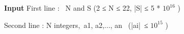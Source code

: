 \textbf{\textbf{Input }}
First line :  N and S (2 ≤ N ≤ 22, |S| ≤ 5 * $10^{16}$ )


Second line : N integers, a1, a2,..., an  (|ai| ≤ $10^{15}$ )
